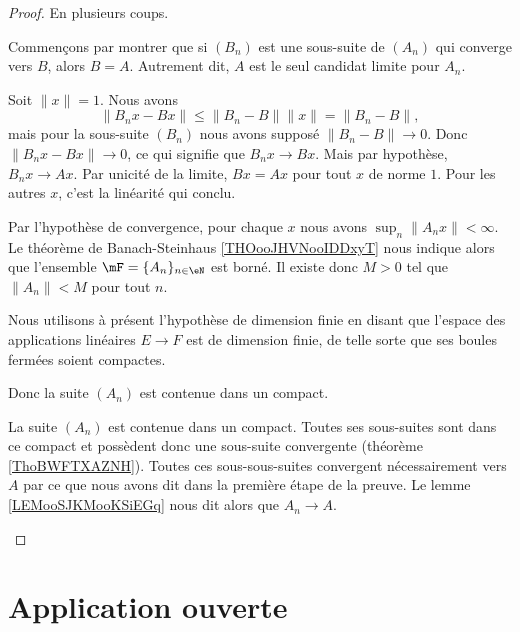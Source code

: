 \begin{proof}
	En plusieurs coups.
	\begin{subproof}
		Commençons par montrer que si \( (B_n)\) est une sous-suite de \( (A_n)\) qui converge vers \( B\), alors \( B=A\). Autrement dit, \( A\) est le seul candidat limite pour \( A_n\).

		Soit \( \| x \|=1\). Nous avons
		\begin{equation}
			\| B_nx-Bx \|\leq \| B_n-B \|\| x \|=\| B_n-B \|,
		\end{equation}
		mais pour la sous-suite \( (B_n)\) nous avons supposé \( \| B_n-B \|\to 0\). Donc \( \| B_nx-Bx \|\to 0\), ce qui signifie que \( B_nx\to Bx\). Mais par hypothèse, \( B_nx\to Ax\). Par unicité de la limite, \( Bx=Ax\) pour tout \( x\) de norme \( 1\). Pour les autres \( x\), c'est la linéarité qui conclu.

		Par l'hypothèse de convergence, pour chaque \( x\) nous avons \( \sup_n\| A_nx \|<\infty\). Le théorème de Banach-Steinhaus \ref{THOooJHVNooIDDxyT} nous indique alors que l'ensemble \( \mF=\{ A_n \}_{n\in \eN}\) est borné. Il existe donc \( M > 0\) tel que \( \| A_n \|< M\) pour tout \( n\).

		Nous utilisons à présent l'hypothèse de dimension finie en disant que l'espace des applications linéaires \( E\to F\) est de dimension finie, de telle sorte que ses boules fermées soient compactes.

		Donc la suite \( (A_n)\) est contenue dans un compact.

		La suite \( (A_n)\) est contenue dans un compact. Toutes ses sous-suites sont dans ce compact et possèdent donc une sous-suite convergente (théorème \ref{ThoBWFTXAZNH}). Toutes ces sous-sous-suites convergent nécessairement vers \( A\) par ce que nous avons dit dans la première étape de la preuve. Le lemme \ref{LEMooSJKMooKSiEGq} nous dit alors que \( A_n\to A\).
	\end{subproof}
\end{proof}


\section{Application ouverte}

